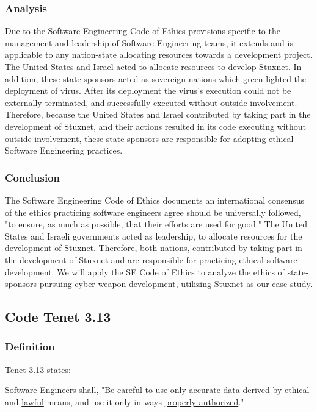 \documentclass[12pt]{article}
\begin{document}
\begin{multicols}{2}
\subsubsection{Analysis}
Due to the Software Engineering Code of Ethics provisions specific to the management and leadership of Software Engineering teams, it extends and is applicable to any nation-state allocating resources towards a development project.\cite{softwareEngineeringCodeOfEthics} The United States and Israel acted to allocate resources to  develop Stuxnet. In addition, these state-sponsors acted as sovereign nations which green-lighted the deployment of virus.\cite{theRealStoryOfStuxnet} After its deployment the virus's execution could not be externally terminated, and successfully executed without outside involvement.\cite{stuxnetFireandForget} Therefore, because the United States and Israel contributed by taking part in the development of Stuxnet, and their actions resulted in its code executing without outside involvement, these state-sponsors are responsible for adopting ethical Software Engineering practices.

\subsubsection{Conclusion}

The Software Engineering Code of Ethics documents an international consensus of the ethics practicing software engineers agree should be universally followed, "to ensure, as much as possible, that their efforts are used for good."\cite{softwareEngineeringCodeOfEthics} The United States and Israeli governments acted as leadership, to allocate resources for the development of Stuxnet. Therefore, both nations, contributed by taking part in the development of Stuxnet and are responsible for practicing ethical software development. We will apply the SE Code of Ethics to analyze the ethics of state-sponsors pursuing cyber-weapon development, utilizing Stuxnet as our case-study.


\subsection{Code Tenet 3.13}

\subsubsection{Definition}

Tenet 3.13  states:
\begin{framed}
Software Engineers shall, "Be careful to use only \ul{accurate data} \ul{derived} by \ul{ethical} and \ul{lawful} means, and use it only in ways \ul{properly authorized}."\cite{softwareEngineeringCodeOfEthics}
\end{framed}


\end{multicols}
\end{document}
